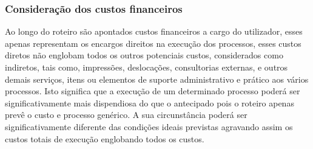 \subsubsection{Consideração dos custos financeiros}

Ao longo do roteiro são apontados custos financeiros a cargo do
utilizador, esses apenas representam os encargos direitos na execução
dos processos, esses custos diretos não englobam todos os outros
potenciais custos, considerados como indiretos, tais como, impressões,
deslocações, consultorias externas, e outros demais serviços, itens ou
elementos de suporte administrativo e prático aos vários processos. Isto
significa que a execução de um determinado processo poderá ser
significativamente mais dispendiosa do que o antecipado pois o roteiro
apenas prevê o custo e processo genérico. A sua circunstância poderá ser
significativamente diferente das condições ideais previstas agravando
assim os custos totais de execução englobando todos os custos.